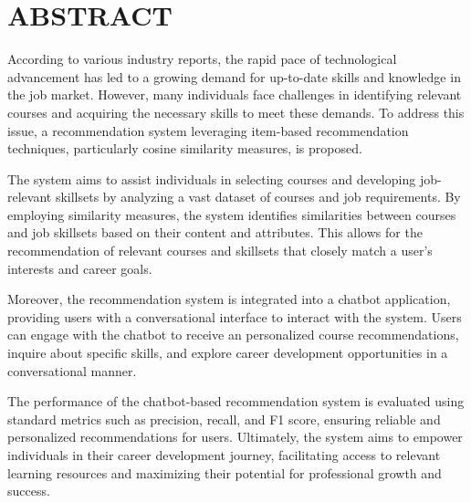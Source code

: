 \chapter*{\uppercase{ABSTRACT}}
According to various industry reports, the rapid pace of technological advancement has led to a growing demand for up-to-date skills and knowledge in the job market. However, many individuals face challenges in identifying relevant courses and acquiring the necessary skills to meet these demands. To address this issue, a recommendation system leveraging item-based recommendation techniques, particularly cosine similarity measures, is proposed.

The system aims to assist individuals in selecting courses and developing job-relevant skillsets by analyzing a vast dataset of courses and job requirements. By employing similarity measures, the system identifies similarities between courses and job skillsets based on their content and attributes. This allows for the recommendation of relevant courses and skillsets that closely match a user's interests and career goals.

Moreover, the recommendation system is integrated into a chatbot application, providing users with a conversational interface to interact with the system. Users can engage with the chatbot to receive an personalized course recommendations, inquire about specific skills, and explore career development opportunities in a conversational manner.

The performance of the chatbot-based recommendation system is evaluated using standard metrics such as precision, recall, and F1 score, ensuring reliable and personalized recommendations for users. Ultimately, the system aims to empower individuals in their career development journey, facilitating access to relevant learning resources and maximizing their potential for professional growth and success.